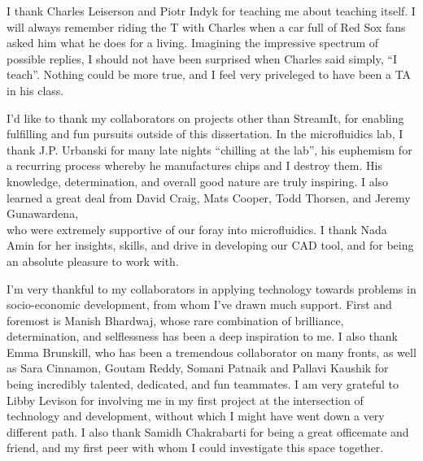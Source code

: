 
I thank Charles Leiserson and Piotr Indyk for teaching me about
teaching itself.  I will always remember riding the T with Charles
when a car full of Red Sox fans asked him what he does for a living.
Imagining the impressive spectrum of possible replies, I should not
have been surprised when Charles said simply, ``I teach''.  Nothing
could be more true, and I feel very priveleged to have been a TA in
his class.

I'd like to thank my collaborators on projects other than StreamIt,
for enabling fulfilling and fun pursuits outside 
of this dissertation.  In the microfluidics lab, I thank
J.P. Urbanski for many late nights ``chilling at the lab'', his
euphemism for a recurring process whereby he manufactures chips and
I destroy them.  His knowledge, determination, and overall good
nature are truly inspiring.  I also learned a great deal from David
Craig, Mats Cooper, Todd Thorsen, and Jeremy Gunawardena, 
%
\newpage
\enlargethispage{0.5\baselineskip}
%
~ \vspace{-1.5\baselineskip}\\
\noindent who were extremely supportive of our foray into
microfluidics.  I thank Nada Amin for her insights, skills, and
drive in developing our CAD tool, and for being an absolute pleasure
to work with.


I'm very thankful to my collaborators in applying technology towards
problems in socio-economic development, from whom I've drawn much
support.  First and foremost is Manish Bhardwaj, whose rare
combination of brilliance, determination, and selflessness has been
a deep inspiration to me.  I also thank Emma Brunskill, who has been
a tremendous collaborator on many fronts, as well as
Sara Cinnamon, Goutam Reddy, Somani Patnaik and Pallavi Kaushik for
being incredibly talented, dedicated, and fun teammates.
%
I am very grateful to Libby Levison for involving me in my first
project at the intersection of technology and development, without
which I might have went down a very different path.  I also thank
Samidh Chakrabarti for being a great officemate and friend, and my
first peer with whom I could investigate this space together.

